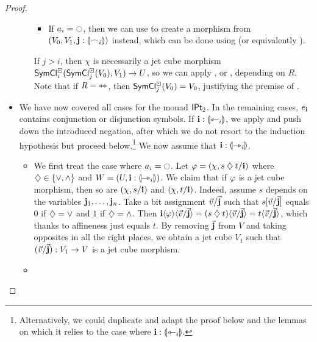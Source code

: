 \documentclass[a4paper]{article}
\begin{document}
\begin{proof}
\begin{itemize}
\begin{itemize}
\begin{itemize}
				\item If $a_i = \npolar$, then we can use  to create a morphism from $(V_0, V_1, \mathbf{j} : {\llparenthesis \frown_i \rrparenthesis})$ instead, which can be done using  (or equivalently ).
			\end{itemize}
			
			If $j > i$, then $\chi$ is necessarily a jet cube morphism $\mathsf{SymCl}^\boxdot_i(\mathsf{SymCl}^\boxdot_j(V_0), V_1) \to U$, so we can apply ,  or , depending on $R$.
			Note that if $R = {\leftrightarrowtriangle}$, then $\mathsf{SymCl}^\boxdot_j(V_0) = V_0$, justifying the premise of .
		\end{itemize}
		
		\item We have now covered all cases for the monad ${\mathsf{IPt}_2}$.
		In the remaining cases, $e_{\mathbf{i}}$ contains conjunction or disjunction symbols.
		If $\mathbf{i} : {\llparenthesis \leftarrowtriangle_i \rrparenthesis}$, we apply  and push down the introduced negation, after which we do not resort to the induction hypothesis but proceed below.\footnote{Alternatively, we could duplicate and adapt the proof below and the lemmas on which it relies to the case where $\mathbf{i} : {\llparenthesis \leftarrowtriangle_i \rrparenthesis}$.}
		We now assume that $\mathbf{i} : {\llparenthesis \rightarrowtriangle_i \rrparenthesis}$.
		
		\begin{itemize}
			\item We first treat the case where $a_i = \npolar$.
			Let $\varphi = (\chi, s \mathbin{\diamondsuit} t/\mathbf{i})$ where $\mathbin{\diamondsuit} \in \mathopen{}\left\{ {\vee}, {\wedge} \right\}\mathclose{}$ and $W = (U, \mathbf{i} : {\llparenthesis \rightarrowtriangle_i \rrparenthesis})$.
			We claim that if $\varphi$ is a jet cube morphism, then so are $(\chi, s/\mathbf{i})$ and $(\chi, t/\mathbf{i})$.
			Indeed, assume $s$ depends on the variables $\mathbf{j}_1, \ldots, \mathbf{j}_n$.
			Take a bit assignment $\vec v/\vec{\mathbf{j}}$ such that $s[\vec v/\vec{\mathbf{j}}]$ equals $0$ if $\mathbin{\diamondsuit} = {\vee}$ and $1$ if $\mathbin{\diamondsuit} = {\wedge}$.
			Then $\mathbf{i} \langle \varphi \rangle \langle \vec v/\vec{\mathbf{j}} \rangle = (s \mathbin{\diamondsuit} t)\langle \vec v/\vec{\mathbf{j}} \rangle = t \langle \vec v/\vec{\mathbf{j}} \rangle$, which thanks to affineness just equals $t$.
			By removing $\vec{\mathbf{j}}$ from $V$ and taking opposites in all the right places, we obtain a jet cube $V_1$ such that $(\vec v/\vec{\mathbf{j}}) : V_1 \to V$ is a jet cube morphism.
			
			\item {}
			

\end{itemize}
\end{itemize}
\end{proof}
\end{document}
